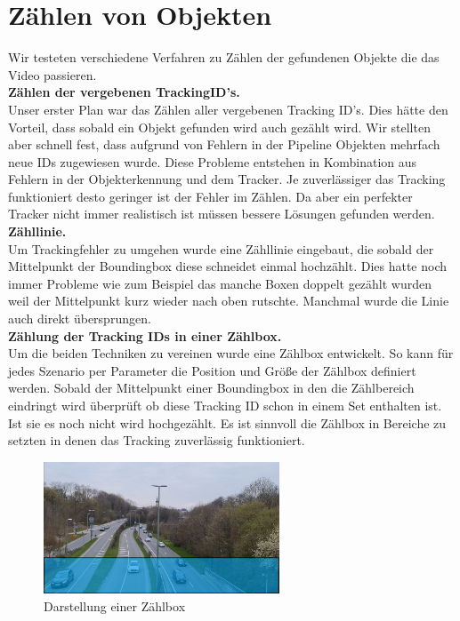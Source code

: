\documentclass[conference]{IEEEtran}
\begin{document}
	
	\section{Zählen von Objekten}
	Wir testeten verschiedene Verfahren zu Zählen der gefundenen Objekte die das Video passieren.\\
	\textbf{Zählen der vergebenen TrackingID's.}\\
	 Unser erster Plan war das Zählen aller vergebenen Tracking ID's. Dies hätte den Vorteil, dass sobald ein Objekt gefunden wird auch gezählt wird. Wir stellten aber schnell fest, dass aufgrund von Fehlern in der Pipeline Objekten mehrfach neue IDs zugewiesen wurde. Diese Probleme entstehen in Kombination aus Fehlern in der Objekterkennung und dem Tracker. Je zuverlässiger das Tracking funktioniert desto geringer ist der Fehler im Zählen. Da aber ein perfekter Tracker nicht immer realistisch ist müssen bessere Lösungen gefunden werden.\\
	\textbf{Zähllinie.}\\
	 Um Trackingfehler zu umgehen wurde eine Zähllinie eingebaut, die sobald der Mittelpunkt der Boundingbox diese schneidet einmal hochzählt. Dies hatte noch immer Probleme wie zum Beispiel das manche Boxen doppelt gezählt wurden weil der Mittelpunkt kurz wieder nach oben rutschte. Manchmal wurde die Linie auch direkt übersprungen.\\
	\textbf{Zählung der Tracking IDs in einer Zählbox.}\\
	 Um die beiden Techniken zu vereinen wurde eine Zählbox entwickelt. So kann für jedes Szenario per Parameter die Position und Größe der Zählbox definiert werden. Sobald der Mittelpunkt einer Boundingbox in den die Zählbereich eindringt wird überprüft ob diese Tracking ID schon in einem Set enthalten ist. Ist sie es noch nicht wird hochgezählt. Es ist sinnvoll die Zählbox in Bereiche zu setzten in denen das Tracking zuverlässig funktioniert. 
	\begin{figure}[!h]
		\begin{center}
			\includegraphics[width=7cm]{Media/BrudermuhlCounter.png}
			\caption{Darstellung einer Zählbox}
			\label{Counter}
		\end{center}
	\end{figure}
	
\end{document}
